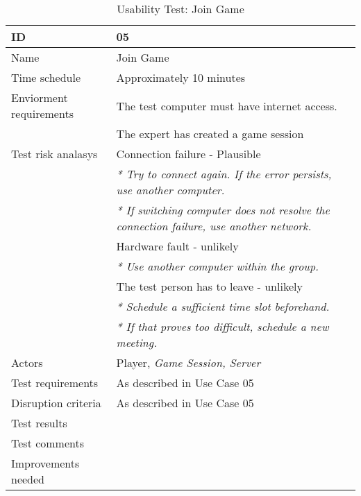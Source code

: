 {\footnotesize
\begin{table}[H]
\begin{tabular}{| p{5cm} | p{10cm} |}\hline
	\textbf{ID}	& \textbf{05} \\ \hline
	Name		& Join Game\\ \hline
	Time schedule	& Approximately 10 minutes\\ \hline
	Enviorment requirements 
		& The test computer must have internet access. \\ 
		& The expert has created a game session\\ \hline
	Test risk analasys 
		& Connection failure - Plausible \\
		& \emph{* Try to connect again. If the error persists, use another computer.} \\
		& \emph{* If switching computer does not resolve the connection failure, use another network.}\\
		& Hardware fault - unlikely \\
		& \emph{* Use another computer within the group.} \\
		& The test person has to leave - unlikely \\
		& \emph{* Schedule a sufficient time slot beforehand.} \\
		& \emph{* If that proves too difficult, schedule a new meeting.}\\ \hline
	Actors	& Player, \emph{Game Session, Server}\\ \hline
	Test requirements & As described in Use Case 05 \\ \hline
	Disruption criteria & As described in Use Case 05  \\ \hline
	Test results 
		& \\ \hline
	Test comments
		& \\ \hline
	Improvements needed
		& \\ \hline
\end{tabular}


\caption{Usability Test: Join Game}
\label{fig:usability_test_5}
\end{table}}



